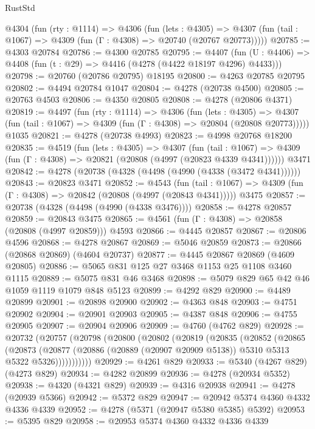 \begin{lexlean}{RustStd}
\begin{coremodule}
{\begin{coremodule}
{{{{{{{{{{{{{{{{{{{{{{{{{{{{{{{{{{{  @4304
    (fun (rty : @1114) =>
    @4306
      (fun (lets : @4305) =>
      @4307 (fun (tail : @1067) => @4309 (fun (Γ : @4308) => @20740 (@20767 @20773)))))
@20785 := @4303 @20784
@20786 := @4300 @20785
@20795 := @4407
    (fun (U : @4406) => @4408 (fun (t : @29) => @4416 (@4278 (@4422 @18197 @4296) @4433)))
@20798 := @20760 (@20786 @20795) @18195
@20800 := @4263 @20785 @20795
@20802 := @4494 @20784 @1047
@20804 := @4278 (@20738 @4500)
@20805 := @20763 @4503
@20806 := @4350 @20805
@20808 := @4278 (@20806 @4371)
@20819 := @4497
    (fun (rty : @1114) =>
    @4306
      (fun (lets : @4305) =>
      @4307 (fun (tail : @1067) => @4309 (fun (Γ : @4308) => @20804 (@20808 @20773)))))
    @1035
@20821 := @4278 (@20738 @4993)
@20823 := @4998 @20768 @18200
@20835 := @4519
    (fun (lets : @4305) =>
    @4307
      (fun (tail : @1067) =>
      @4309 (fun (Γ : @4308) => @20821 (@20808 (@4997 (@20823 @4339 @4341))))))
    @3471
@20842 := @4278 (@20738 (@4328 (@4498 (@4990 (@4338 (@3472 @4341))))))
@20843 := @20823 @3471
@20852 := @4543
    (fun (tail : @1067) => @4309 (fun (Γ : @4308) => @20842 (@20808 (@4997 (@20843 @4341)))))
    @3475
@20857 := @20738 (@4328 (@4498 (@4990 (@4338 @3476))))
@20858 := @4278 @20857
@20859 := @20843 @3475
@20865 := @4561 (fun (Γ : @4308) => @20858 (@20808 (@4997 @20859))) @4593
@20866 := @4445 @20857
@20867 := @20806 @4596
@20868 := @4278 @20867
@20869 := @5046 @20859
@20873 := @20866 (@20868 @20869) (@4604 @20737)
@20877 := @4445 @20867 @20869 (@4609 @20805)
@20886 := @5065 @831 @125 @27 @3468 @1153 @25 @1108 @3460 @1115
@20889 := @5075 @831 @46 @3468
@20898 := @5079 @829 @65 @42 @46 @1059 @1119 @1079 @848 @5123
@20899 := @4292 @829
@20900 := @4489 @20899
@20901 := @20898 @20900
@20902 := @4363 @848
@20903 := @4751 @20902
@20904 := @20901 @20903
@20905 := @4387 @848
@20906 := @4755 @20905
@20907 := @20904 @20906
@20909 := @4760 (@4762 @829)
@20928 := @20732
    (@20757
      (@20798
        (@20800
          (@20802
            (@20819
              (@20835
                (@20852
                  (@20865
                    (@20873
                      (@20877
                        (@20886 (@20889 (@20907 @20909 @5138)) @5310 @5313 @5322 @5326)))))))))))
@20929 := @4261 @829
@20933 := @5340 (@4267 @829) (@4273 @829)
@20934 := @4282 @20899
@20936 := @4278 (@20934 @5352)
@20938 := @4320 (@4321 @829)
@20939 := @4316 @20938
@20941 := @4278 (@20939 @5366)
@20942 := @5372 @829
@20947 := @20942 @5374 @4360 @4332 @4336 @4339
@20952 := @4278 (@5371 (@20947 @5380 @5385) @5392)
@20953 := @5395 @829
@20958 := @20953 @5374 @4360 @4332 @4336 @4339
}}}}}}}}}}}}}}}}}}}}}}}}}}}}}}}}}}}
\end{coremodule}}
\end{coremodule}
\end{lexlean}
